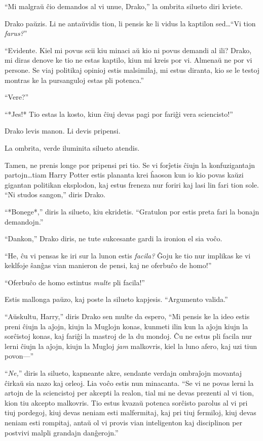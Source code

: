 ``Mi malgraŭ ĉio demandos al vi unue, Drako,'' la ombrita silueto diri
kviete.

Drako paŭzis. Li ne antaŭvidis tion, li pensis ke li vidus la kaptilon
sed\ldots ``Vi tion \emph{farus?}''

``Evidente. Kiel mi povus scii kiu minaci aŭ kio ni povus demandi al
ili? Drako, mi diras denove ke tio ne estas kaptilo, kiun mi kreis por
vi. Almenaŭ ne por vi persone. Se viaj politikaj opinioj estis
malsimilaj, mi estus diranta, kio se le testoj montras ke la
pursanguloj estas pli potenca.''

``Vere?''

``*Jes!* Tio estas la kosto, kiun ĉiuj devas pagi por fariĝi vera
sciencisto!''

Drako levis manon. Li devis pripensi.

La ombrita, verde iluminita silueto atendis.

Tamen, ne prenis longe por pripensi pri tio. Se vi forĵetis ĉiujn la
konfuzigantajn partojn\ldots tiam Harry Potter estis plananta krei
ĥaoson kun io kio povas kaŭzi gigantan politikan eksplodon, kaj estus
freneza nur foriri kaj lasi lin fari tion sole. ``Ni studos sangon,''
diris Drako.

``*Bonege*,'' diris la silueto, kiu ekridetis. ``Gratulon por estis
preta fari la bonajn demandojn.''

``Dankon,'' Drako diris, ne tute sukcesante gardi la ironion el sia
voĉo.

``He, ĉu vi pensas ke iri sur la lunon estis \emph{facila?} Ĝoju ke
tio nur implikas ke vi keklfoje ŝanĝas vian manieron de pensi, kaj ne
oferbuĉo de homo!''

``Oferbuĉo de homo estintus \emph{multe} pli facila!''

Estis mallonga paŭzo, kaj poste la silueto kapjesis. ``Argumento
valida.''

``Aŭskultu, Harry,'' diris Drako sen multe da espero, ``Mi pensis ke
la ideo estis preni ĉiujn la aĵojn, kiujn la Muglojn konas, kunmeti
ilin kun la aĵojn kiujn la sorĉistoj konas, kaj fariĝi la mastroj de
la du mondoj.  Ĉu ne estus pli facila nur lerni ĉiujn la aĵojn, kiujn
la Mugloj \emph{jam} malkovris, kiel la luno afero, kaj uzi tiun
povon—''

``\emph{Ne,}'' diris la silueto, kapneante akre, sendante verdajn
ombraĵojn movantaj ĉirkaŭ sia nazo kaj orleoj. Lia voĉo estis nun
minacanta. ``Se vi ne povas lerni la artojn de la sciencistoj per
akcepti la realon, tial mi ne devas prezenti al vi tion, kion tiu
akcepto malkovris. Tio estus kvazaŭ potenca sorĉisto parolus al vi pri
tiuj pordegoj, kiuj devas neniam esti malfermitaj, kaj pri tiuj
fermiloj, kiuj devas neniam esti rompitaj, antaŭ ol vi provis vian
inteligenton kaj disciplinon per postvivi malpli grandajn danĝerojn.''

